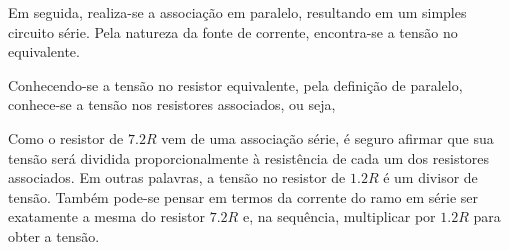 \documentclass{article}
\numberwithin{equation}{section}
\let\dfr\dfrac
\begin{document}
\noindent Em seguida, realiza-se a associação em paralelo, resultando em um simples circuito série. Pela natureza da fonte de corrente, encontra-se a tensão no equivalente.

\begin{center}
\end{center}

\noindent Conhecendo-se a tensão no resistor equivalente, pela definição de paralelo, conhece-se a tensão nos resistores associados, ou seja,

\begin{center}
\end{center}

\noindent Como o resistor de $7.2R$ vem de uma associação série, é seguro afirmar que sua tensão será dividida proporcionalmente à resistência de cada um dos resistores associados. Em outras palavras, a tensão no resistor de $1.2R$ é um divisor de tensão. Também pode-se pensar em termos da corrente do ramo em série ser exatamente a mesma do resistor $7.2R$ e, na sequência, multiplicar por $1.2R$ para obter a tensão.

\begin{center}
\end{center}
\end{document}
